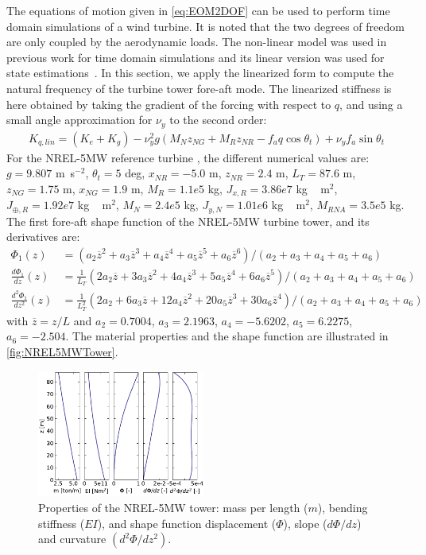 \documentclass[wes, manuscript]{copernicus}
\renewcommand{\bar}{\overline}
\begin{document}
The equations of motion given in \autoref{eq:EOM2DOF} can be used to perform time domain simulations of a wind turbine.
It is noted that the two degrees of freedom are only coupled by the aerodynamic loads.
The non-linear model was used in previous work for time domain simulations and its linear version was used for state estimations~\citep{Branlard:2020twin,Branlard:2020twinOF}.
In this section, we apply the linearized form to compute the natural frequency of the turbine tower fore-aft mode.
The linearized stiffness is here obtained by taking the gradient of the forcing with respect to $q$, and using a small angle approximation for $\nu_y$ to the second order:
\begin{align}
K_{q,lin}= (K_{e} + K_g)
- \nu_{y}^{2} g \left(M_N z_{NG} + M_{R} z_{NR} - f_a q \cos\theta_t\right)
+ \nu_{y} f_a \sin\theta_t 
\end{align}
For the NREL-5MW reference turbine \citep{nrel5mw}, the different numerical values are:
$g=9.807$ \unit{m.s}$^{-2}$,
$\theta_t=5$ \unit{deg},
$x_{NR}=-5.0$ \unit{m},
$z_{NR}= 2.4$ \unit{m},
$L_T=87.6$ \unit{m},
$z_{NG}=1.75$ \unit{m},
$x_{NG}=1.9$ \unit{m},
$M_R= 1.1e5$ \unit{kg},
$J_{x,R}=3.86e7$ \unit{kg\,m}$^2$,
$J_{\oplus,R}=1.92e7$ \unit{kg\,m}$^2$,
$M_N=2.4e5$ \unit{kg},
$J_{y,N} =1.01e6$ \unit{kg\,m}$^2$,
$M_{RNA}=3.5e5$ \unit{kg}.
The first fore-aft shape function of the NREL-5MW turbine tower, and its derivatives are:
\begin{align}
   \Phi_1(z) &= (a_2 \bar{z}^2+ a_3 \bar{z}^3+ a_4 \bar{z}^4+ a_5 \bar{z}^5+ a_6 \bar{z}^6)/(a_2+a_3+a_4+a_5+a_6)\nonumber \\
   \frac{d\Phi_1}{dz}(z) &= \frac{1}{L_T}(2a_2 \bar{z}+ 3a_3 \bar{z}^2+ 4a_4 \bar{z}^3+ 5a_5 \bar{z}^4+ 6a_6 \bar{z}^5)/(a_2+a_3+a_4+a_5+a_6)\label{eq:ShapeFunctionsPoly}  \\  
   \frac{d^2\Phi_1}{dz^2}(z) &= \frac{1}{L_T^2}(2a_2+ 6a_3 \bar{z}+ 12a_4 \bar{z}^2+ 20a_5 \bar{z}^3+ 30a_6 \bar{z}^4)/(a_2+a_3+a_4+a_5+a_6) 
   \nonumber
\end{align}
with $\bar{z}=z/L$ and $a_2=0.7004$, $ a_3=2.1963$, $a_4=-5.6202$, $a_5=6.2275$, $a_6=-2.504$.
The material properties and the shape function are illustrated in \autoref{fig:NREL5MWTower}. 
\noindent\begin{figure}[!htb]\centering%
  \includegraphics[width=0.49\textwidth]{figs/NREL5MWTower.pdf}
  \caption{Properties of the NREL-5MW tower: mass per length ($m$), bending stiffness ($EI$), and shape function displacement ($\Phi$), slope ($d\Phi/dz$) and curvature $(d^2\Phi/dz^2)$.}\label{fig:NREL5MWTower}%
\end{figure}
\end{document}
